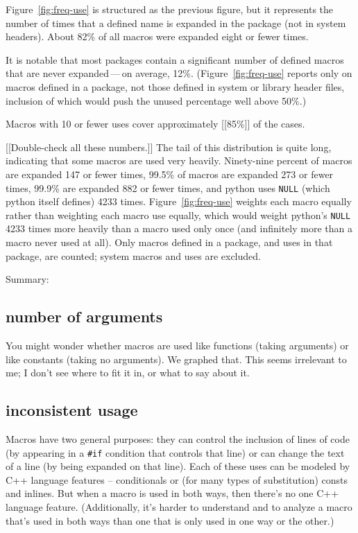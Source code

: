 \documentclass[10pt]{article}
\newcommand{\pkg}[1]{\textsf{#1}}
\begin{document}
Figure~\ref{fig:freq-use} is structured as the previous figure, but it
represents the number of times that a defined name is expanded in 
the package (not in system headers).  About 82\% of all macros were
expanded eight or fewer times.

It is notable that most packages contain a significant number of defined
macros that are never expanded\,---\,on average, 12\%.
(Figure~\ref{fig:freq-use} reports only on macros defined in a package, not
those defined in system or library header files, inclusion of which would
push the unused percentage well above 50\%.)

Macros with 10 or fewer uses
cover approximately [[85\%]] of the cases.

[[Double-check all these numbers.]]
The tail of this distribution is quite long, indicating that some macros
are used very heavily.  Ninety-nine percent of macros are expanded 147 or fewer
times, 99.5\% of macros are expanded 273 or fewer times, 99.9\% are
expanded 882 or fewer times, and \pkg{python} uses {\tt NULL} (which \pkg{python}
itself defines) 4233 times.  Figure~\ref{fig:freq-use} weights each macro
equally rather than weighting each macro use equally, which would weight
\pkg{python}'s {\tt NULL} 4233 times more heavily than a macro used only once
(and infinitely more than a macro never used at all).  Only macros defined
in a package, and uses in that package, are counted; system macros and uses
are excluded.

Summary:  


\subsection{number of arguments}

        You might wonder whether macros are used like functions (taking
        arguments) or like constants (taking no arguments).  We graphed
        that.  This seems irrelevant to me; I don't see where to fit it in,
        or what to say about it.

\subsection{inconsistent usage}

    Macros have two general purposes:  they can control the inclusion of
        lines of code (by appearing in a {\tt \#if} condition that controls that
        line) or can change the text of a line (by being expanded on that
        line).  Each of these uses can be modeled by C++ language features
        -- conditionals or (for many types of substitution) consts and
        inlines.  But when a macro is used in both ways, then there's no
        one C++ language feature.  (Additionally, it's harder to understand
        and to analyze a macro that's used in both ways than one that is
        only used in one way or the other.)
\end{document}
